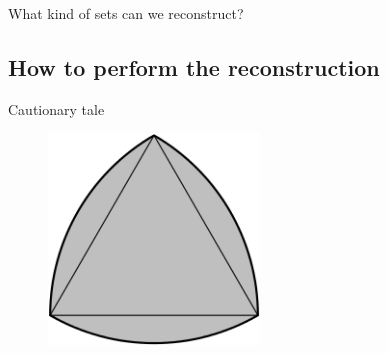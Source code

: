 \documentclass{beamer}
\begin{document}
\begin{frame}{What kind of sets can we reconstruct?}
    \begin{figure}[H]
        \begin{floatrow}
        \end{floatrow}
    \end{figure}
\end{frame}

\subsection{How to perform the reconstruction}

\begin{frame}{Cautionary tale}
    \begin{figure}[H]
      \centering
        \includegraphics[width=0.5\textwidth]{const_width.png}
      \label{fig:f2}
    \end{figure}
\end{frame}
\end{document}
